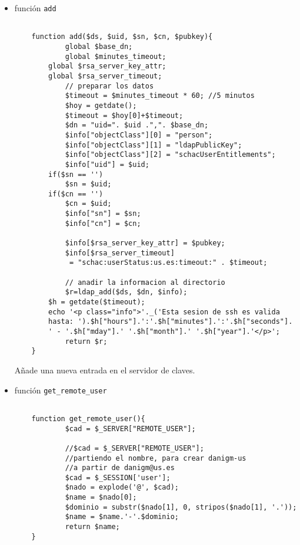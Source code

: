 \begin{itemize}
    \item función \texttt{add}

    \begin{lstlisting}

    function add($ds, $uid, $sn, $cn, $pubkey){
            global $base_dn;
            global $minutes_timeout;
        global $rsa_server_key_attr;
        global $rsa_server_timeout;
            // preparar los datos
            $timeout = $minutes_timeout * 60; //5 minutos
            $hoy = getdate();
            $timeout = $hoy[0]+$timeout;
            $dn = "uid=". $uid .",". $base_dn;
            $info["objectClass"][0] = "person";
            $info["objectClass"][1] = "ldapPublicKey";
            $info["objectClass"][2] = "schacUserEntitlements";
            $info["uid"] = $uid;
        if($sn == '')
            $sn = $uid;
        if($cn == '')
            $cn = $uid;
            $info["sn"] = $sn;
            $info["cn"] = $cn;

            $info[$rsa_server_key_attr] = $pubkey;
            $info[$rsa_server_timeout] 
             = "schac:userStatus:us.es:timeout:" . $timeout;

            // anadir la informacion al directorio
            $r=ldap_add($ds, $dn, $info);
        $h = getdate($timeout);
        echo '<p class="info">'._('Esta sesion de ssh es valida
        hasta: ').$h["hours"].':'.$h["minutes"].':'.$h["seconds"].
        ' - '.$h["mday"].' '.$h["month"].' '.$h["year"].'</p>';
            return $r;
    }

    \end{lstlisting}

    Añade una nueva entrada en el servidor de claves.

    \item función \texttt{get\_remote\_user}

    \begin{lstlisting}

    function get_remote_user(){
            $cad = $_SERVER["REMOTE_USER"];

            //$cad = $_SERVER["REMOTE_USER"];
            //partiendo el nombre, para crear danigm-us
            //a partir de danigm@us.es
            $cad = $_SESSION['user'];
            $nado = explode('@', $cad);
            $name = $nado[0];
            $dominio = substr($nado[1], 0, stripos($nado[1], '.'));
            $name = $name.'-'.$dominio;
            return $name;
    }

    \end{lstlisting}


\end{itemize}
